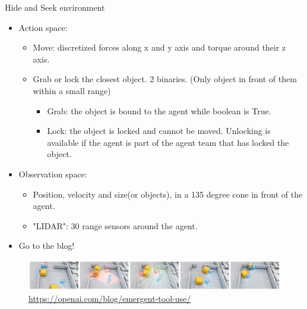 \documentclass{beamer}
\begin{document}
\begin{frame}{Hide and Seek environment}
\begin{itemize}
    \item Action space:
    \begin{itemize}
        \item Move: discretized forces along x and y axis and torque around their z axis.
        \item Grab or lock the closest object. 2 binaries. (Only object in front of them within a small range)
        \begin{itemize}
        \item Grab: the object is bound to the agent while boolean is True.
        \item Lock: the object is locked and cannot be moved. Unlocking is available if the agent is part of the agent team that has locked the object.
        \end{itemize}{}
        
    \end{itemize}{}
    \item Observation space:
    \begin{itemize}
        \item Position, velocity and size(or objects), in a 135 degree cone in front of the agent.
        \item "LIDAR": 30 range sensors around the agent.
    \end{itemize}{}
    \item Go to the blog!
\end{itemize}{}
    \begin{figure}
    \centering
    \includegraphics[scale=0.2]{hasblog1.png}
    \caption{\url{https://openai.com/blog/emergent-tool-use/}}
    \end{figure}
\end{frame}{}
\end{document}
